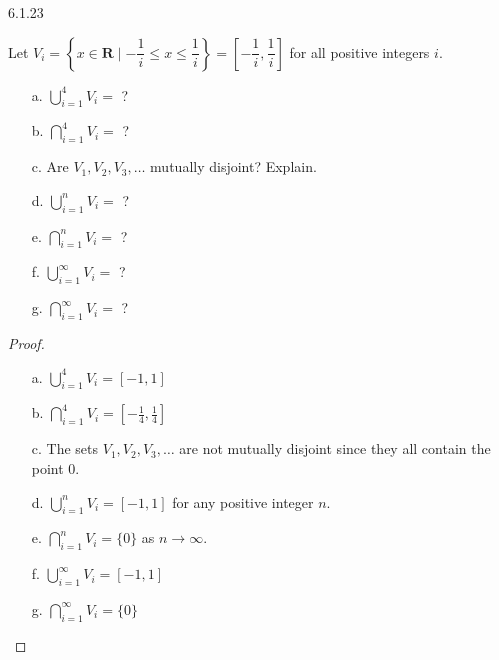 \begin{question}
    {6.1.23}
    {
        Let $V_i=\left\{x \in \mathbf{R} \mid-\dfrac{1}{i} \leq x \leq \dfrac{1}{i}\right\}=\left[-\dfrac{1}{i}, \dfrac{1}{i}\right]$ for all positive integers $i$.
        \vspace{-\baselineskip}
        \begin{enumerate}
            \item[a.] $\bigcup_{i=1}^4 V_i=$ ?
            \item[b.] $\bigcap_{i=1}^4 V_i=$ ?
            \item[c.] Are $V_1, V_2, V_3, \ldots$ mutually disjoint? Explain.
            \item[d.] $\bigcup_{i=1}^n V_i=$ ?
            \item[e.] $\bigcap_{i=1}^n V_i=$ ?
            \item[f.] $\bigcup_{i=1}^{\infty} V_i=$ ?
            \item[g.] $\bigcap_{i=1}^{\infty} V_i=$ ?
        \end{enumerate}
    }
\end{question}
\begin{proof}
    \begin{enumerate}
        \item[a.] $\bigcup_{i=1}^4 V_i = [-1, 1]$
        \item[b.] $\bigcap_{i=1}^4 V_i = \left[-\frac{1}{4}, \frac{1}{4}\right]$
        \item[c.] The sets $V_1, V_2, V_3, \ldots$ are not mutually disjoint since they all contain the point 0.
        \item[d.] $\bigcup_{i=1}^n V_i = [-1, 1]$ for any positive integer $n$.
        \item[e.] $\bigcap_{i=1}^n V_i = \{0\}$ as $n \rightarrow \infty$.
        \item[f.] $\bigcup_{i=1}^{\infty} V_i = [-1, 1]$
        \item[g.] $\bigcap_{i=1}^{\infty} V_i = \{0\}$
    \end{enumerate}    
\end{proof}

